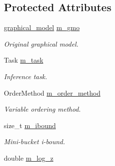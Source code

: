 \subsection*{Protected Attributes}
\begin{DoxyCompactItemize}
\item 
\hypertarget{classmerlin_1_1wmb_a3aaf9e90947e65689d112c165f734b40}{}\hyperlink{classmerlin_1_1graphical__model}{graphical\+\_\+model} \hyperlink{classmerlin_1_1wmb_a3aaf9e90947e65689d112c165f734b40}{m\+\_\+gmo}\label{classmerlin_1_1wmb_a3aaf9e90947e65689d112c165f734b40}

\begin{DoxyCompactList}\small\item\em Original graphical model. \end{DoxyCompactList}\item 
\hypertarget{classmerlin_1_1wmb_ae015453f4b405e1ab4798d32a09fe63d}{}Task \hyperlink{classmerlin_1_1wmb_ae015453f4b405e1ab4798d32a09fe63d}{m\+\_\+task}\label{classmerlin_1_1wmb_ae015453f4b405e1ab4798d32a09fe63d}

\begin{DoxyCompactList}\small\item\em Inference task. \end{DoxyCompactList}\item 
\hypertarget{classmerlin_1_1wmb_ac9c473f2f6c6f727bc694a1ecb3cec16}{}Order\+Method \hyperlink{classmerlin_1_1wmb_ac9c473f2f6c6f727bc694a1ecb3cec16}{m\+\_\+order\+\_\+method}\label{classmerlin_1_1wmb_ac9c473f2f6c6f727bc694a1ecb3cec16}

\begin{DoxyCompactList}\small\item\em Variable ordering method. \end{DoxyCompactList}\item 
\hypertarget{classmerlin_1_1wmb_a56f63e7abb2345db6cba7bb0a6572386}{}size\+\_\+t \hyperlink{classmerlin_1_1wmb_a56f63e7abb2345db6cba7bb0a6572386}{m\+\_\+ibound}\label{classmerlin_1_1wmb_a56f63e7abb2345db6cba7bb0a6572386}

\begin{DoxyCompactList}\small\item\em Mini-\/bucket i-\/bound. \end{DoxyCompactList}\item 
\hypertarget{classmerlin_1_1wmb_ac0e420613dd6b983ade039b5c0951bf2}{}double \hyperlink{classmerlin_1_1wmb_ac0e420613dd6b983ade039b5c0951bf2}{m\+\_\+log\+\_\+z}\label{classmerlin_1_1wmb_ac0e420613dd6b983ade039b5c0951bf2}


\end{DoxyCompactItemize}
